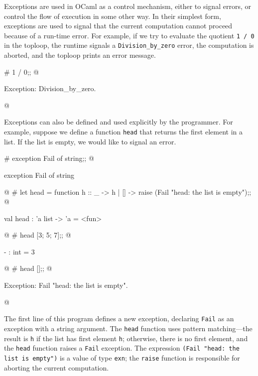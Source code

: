 
Exceptions are used in OCaml as a control mechanism, either to signal errors, or control the flow of
execution in some other way.  In their simplest form, exceptions are used to signal that the current
computation cannot proceed because of a run-time error.  For example, if we try to evaluate the
quotient \lstinline+1 / 0+ in the toploop, the runtime signals a \hbox{\lstinline/Division_by_zero/} error,
the computation is aborted, and the toploop prints an error message.

\begin{ocaml}
# 1 / 0;;
@
\begin{topoutput}
Exception: Division_by_zero.
\end{topoutput}
@
\end{ocaml}
%
Exceptions can also be defined and used explicitly by the programmer.  For example, suppose we
define a function \hbox{\lstinline/head/} that returns the first element in a list.  If the list is empty,
we would like to signal an error.

\label{keyword:exception}
\begin{ocaml}
# exception Fail of string;;
@
\begin{topoutput}
exception Fail of string
\end{topoutput}
@
# let head = function
     h :: _ -> h
   | [] -> raise (Fail "head: the list is empty");;
@
\begin{topoutput}
val head : 'a list -> 'a = <fun>
\end{topoutput}
@
# head [3; 5; 7];;
@
\begin{topoutput}
- : int = 3
\end{topoutput}
@
# head [];;
@
\begin{topoutput}
Exception: Fail "head: the list is empty".
\end{topoutput}
@
\end{ocaml}
%
The first line of this program defines a new exception, declaring
\hbox{\lstinline/Fail/} as an exception with a string argument.  The
\hbox{\lstinline/head/} function uses pattern matching---the result is
\hbox{\lstinline/h/} if the list has first element \hbox{\lstinline/h/}; otherwise, there is
no first element, and the \hbox{\lstinline/head/} function raises a \hbox{\lstinline/Fail/}
exception.  The expression \hbox{\lstinline/(Fail "head: the list is empty")/} is
a value of type \hbox{\lstinline/exn/}; the \hbox{\lstinline/raise/} function is responsible
for aborting the current computation.

